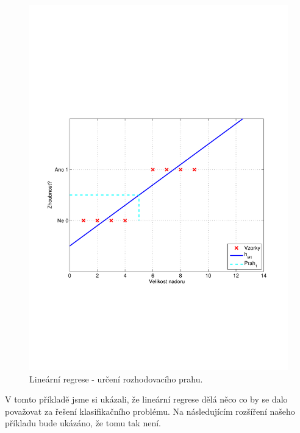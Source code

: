 {\begin{figure}[!ht]
\begin{minipage}[b]{0.48\textwidth}
		\includegraphics[width = \textwidth, trim = 2.5cm 7cm 2cm 9cm]{./Img/BinarniRegrese/prikladNadory/tumor_3st_example.pdf}
		\caption{Lineární regrese - určení rozhodovacího prahu.}
		\label{fig:nadory3}
	\end{minipage}%
\end{figure}}

\par{V tomto příkladě jsme si ukázali, že lineární regrese dělá něco co by se dalo považovat za řešení klasifikačního problému. Na následujícím rozšíření našeho příkladu bude ukázáno, že tomu tak není.}

